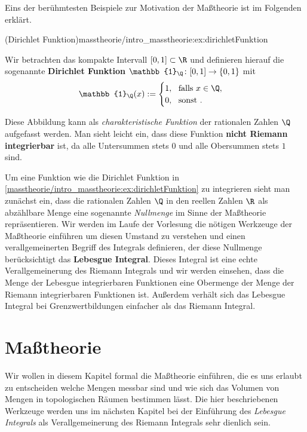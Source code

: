 \documentclass[letterpaper,10pt,german]{jupyterBook}
\begin{document}
\par
Eins der berühmtesten Beispiele zur Motivation der Maßtheorie ist im Folgenden erklärt.
\begin{example}{(Dirichlet Funktion)}{masstheorie/intro_masstheorie:ex:dirichletFunktion}



\par
Wir betrachten das kompakte Intervall \([0,1] \subset \R\) und definieren hierauf die sogenannte \textbf{Dirichlet Funktion} \(\mathbb{1}_\Q \colon [0,1] \rightarrow \{0,1\}\) mit
\begin{align*}
\mathbb{1}_\Q(x) := \begin{cases} 1, \ \text{ falls } x \in \Q, \\ 0, \ \text{ sonst }.\end{cases}
\end{align*}
\par
Diese Abbildung kann als \emph{charakteristische Funktion} der rationalen Zahlen \(\Q\) aufgefasst werden.
Man sieht leicht ein, dass diese Funktion \textbf{nicht Riemann integrierbar} ist, da alle Untersummen stets \(0\) und alle Obersummen stets \(1\) sind.
\end{example}

\par
Um eine Funktion wie die Dirichlet Funktion in \cref{masstheorie/intro_masstheorie:ex:dirichletFunktion} zu integrieren sieht man zunächst ein, dass die rationalen Zahlen \(\Q\) in den reellen Zahlen \(\R\) als abzählbare Menge eine sogenannte \emph{Nullmenge} im Sinne der Maßtheorie repräsentieren.
Wir werden im Laufe der Vorlesung die nötigen Werkzeuge der Maßtheorie einführen um diesen Umstand zu verstehen und einen verallgemeinerten Begriff des Integrals definieren, der diese Nullmenge berücksichtigt   das \textbf{Lebesgue Integral}.
Dieses Integral ist eine echte Verallgemeinerung des Riemann Integrals und wir werden einsehen, dass die Menge der Lebesgue integrierbaren Funktionen eine Obermenge der Menge der Riemann integrierbaren Funktionen ist.
Außerdem verhält sich das Lebesgue Integral bei Grenzwertbildungen einfacher als das Riemann Integral.


\section{Maßtheorie}
\label{\detokenize{masstheorie/masstheorie:masztheorie}}\label{\detokenize{masstheorie/masstheorie::doc}}
\par
Wir wollen in diesem Kapitel formal die Maßtheorie einführen, die es uns erlaubt zu entscheiden welche Mengen messbar sind und wie sich das Volumen von Mengen in topologischen Räumen bestimmen lässt.
Die hier beschriebenen Werkzeuge werden uns im nächsten Kapitel bei der Einführung des \emph{Lebesgue Integrals} als Verallgemeinerung des Riemann Integrals sehr dienlich sein.
\end{document}
